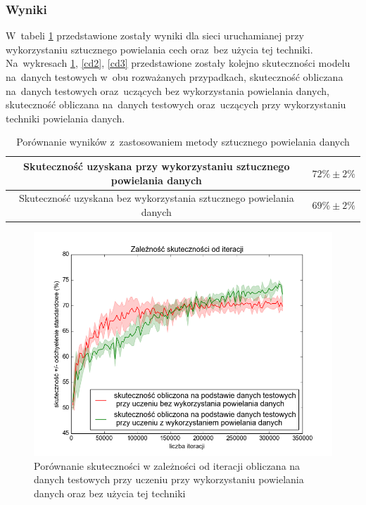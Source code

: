 \subsubsection{Wyniki}
W~tabeli \ref{table:catdogs} przedstawione zostały wyniki dla sieci uruchamianej przy wykorzystaniu sztucznego powielania cech oraz~bez użycia tej techniki. Na~wykresach \ref{cd_1}, \ref{cd2}, \ref{cd3} przedstawione zostały kolejno skuteczności modelu na~danych testowych w~obu rozważanych przypadkach, skuteczność obliczana na~danych testowych oraz~uczących bez wykorzystania powielania danych, skuteczność obliczana na~danych testowych oraz~uczących przy wykorzystaniu techniki powielania danych.

\begin{table}
\centering
\begin{tabular}{|c|c|}
\hline
Skuteczność uzyskana przy wykorzystaniu sztucznego powielania danych & $72\% \pm 2\%$ \\
\hline 
Skuteczność uzyskana bez wykorzystania sztucznego powielania danych & $69\% \pm 2\%$ \\
\hline 
 \end{tabular}
 \caption{Porównanie wyników z~zastosowaniem metody sztucznego powielania danych} \label{table:catdogs}
\end{table}

\begin{figure}[ht!]
\centering
\includegraphics[scale=0.7]{res/comptest.png}
\caption[Caption for LOF]{Porównanie skuteczności w zależności od iteracji obliczana na danych testowych przy uczeniu przy wykorzystaniu powielania danych oraz bez użycia tej techniki\label{cd_1}}
\end{figure} 

